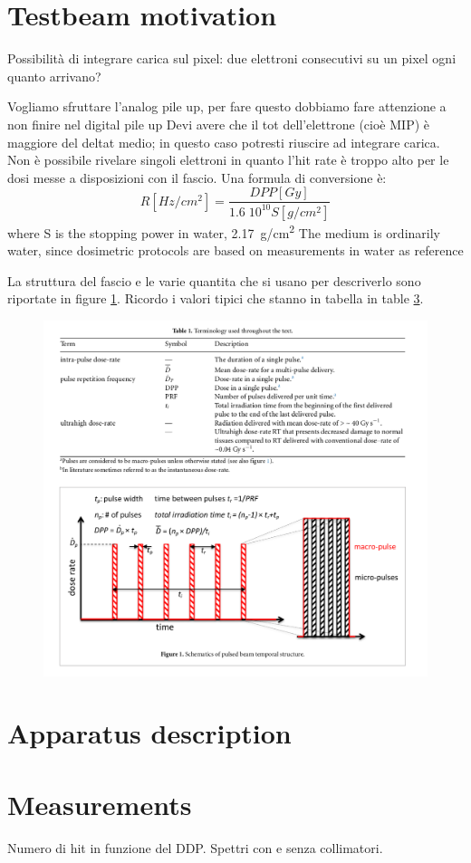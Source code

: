 \section{Testbeam motivation}
   Possibilità di integrare carica sul pixel: due elettroni consecutivi su un pixel ogni quanto arrivano?

   Vogliamo sfruttare l'analog pile up, per fare questo dobbiamo fare attenzione a non finire nel digital pile up
   Devi avere che il tot dell'elettrone (cioè MIP) è maggiore del deltat medio; in questo caso potresti riuscire ad integrare carica.
   Non è possibile rivelare singoli elettroni in quanto l'hit rate è troppo alto per le dosi messe a disposizioni con il fascio. Una formula di conversione è: 
   \begin{equation}
      R[Hz/cm^2] = \frac{DPP[Gy]}{1.6 \;10^{10} S[g/cm^2]}
   \end{equation}
   where S is the stopping power in water, \SI{2.17}{g/cm\squared}
   The medium is ordinarily water, since dosimetric protocols are based on measurements in water as reference

   La struttura del fascio e le varie quantita che si usano per descriverlo sono riportate in figure \ref{fig:}. Ricordo i valori tipici che stanno in tabella in table \ref{}.
   \begin{figure}
      \centering
      \includegraphics[width=.98\linewidth]{figures/test_beam/dose_param.png}
      \caption{}
      \label{fig:}
   \end{figure}

\section{Apparatus description}


\section{Measurements}
   Numero di hit in funzione del DDP. Spettri con e senza collimatori. 







